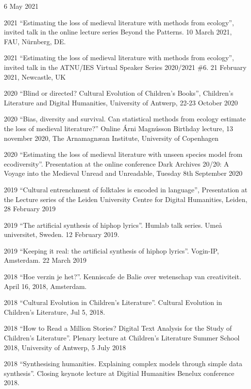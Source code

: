 \documentclass[12pt,letterpaper]{report}
\begin{document}
\begin{tablist}
  6 May 2021
\item[2021] \tab{}``Estimating the loss of medieval literature with methods from
  ecology'', invited talk in the online lecture series Beyond the Patterns. 10 March 2021,
  FAU, Nürnberg, DE. 
\item[2021] \tab{}``Estimating the loss of medieval literature with methods from
    ecology'', invited talk in the ATNU/IES Virtual Speaker Series 2020/2021 \#6. 21
    February 2021, Newcastle, UK
\item[2020] \tab{}``Blind or directed? Cultural Evolution of Children's Books'',
    Children’s Literature and Digital Humanities, University of Antwerp, 22-23 October
    2020
\item[2020] \tab{}``Bias, diversity and survival. Can statistical methods from ecology
    estimate the loss of medieval literature?'' Online Árni Magnússon Birthday lecture, 13
    november 2020, The Arnamagnæan Institute, University of Copenhagen
\item[2020] \tab{}``Estimating the loss of medieval literature with unseen species model
    from ecodiversity''. Presentation at the online conference Dark Archives 20/20: A
    Voyage into the Medieval Unread and Unreadable, Tuesday 8th September 2020
\item[2019] \tab{}``Cultural entrenchment of folktales is encoded in language'',
  Presentation at the Lecture series of the Leiden University Centre for Digital
  Humanities, Leiden, 28 February 2019
\item[2019] \tab{}``The artificial synthesis of hiphop lyrics''. Humlab talk series. Umeå
  universitet, Sweden. 12 February 2019.
\item[2019] \tab{}``Keeping it real: the artificial synthesis of hiphop lyrics''. Vogin-IP,
  Amsterdam. 22 March 2019
\item[2018] \tab{}``Hoe verzin je het?''. Kenniscafe de Balie over wetenschap van
  creativiteit. April 16, 2018, Amsterdam. 
\item[2018] \tab{}``Cultural Evolution in Children’s Literature''. Cultural Evolution in
  Children's Literature, Jul 5, 2018. 
\item[2018] \tab{}``How to Read a Million Stories? Digital Text Analysis for the Study of
  Children's Literature''. Plenary lecture at Children’s Literature Summer School 2018,
  University of Antwerp, 5 July 2018
\item[2018] \tab{}``Synthesising humanities. Explaining complex models through simple data
  synthesis''. Closing keynote lecture at Digitial Humanities Benelux conference 2018.

\end{tablist}
\end{document}
